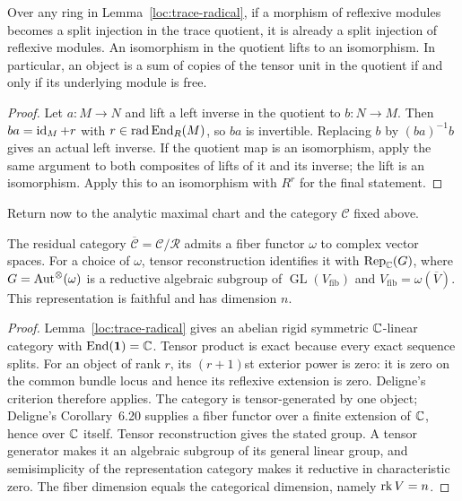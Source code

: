 \begin{lemma}
\label{loc:split-lift}
Over any ring in Lemma~\ref{loc:trace-radical},
if a morphism of reflexive modules becomes a split injection in the
trace quotient, it is already a split injection of reflexive modules.
An isomorphism in the quotient lifts to an isomorphism.  In
particular, an object is a sum of copies of the tensor unit in the
quotient if and only if its underlying module is free.
\end{lemma}

\begin{proof}
Let $a:M\to N$ and lift a left inverse in the quotient to
$b:N\to M$.  Then $ba=\operatorname{id}_M+r$ with $r\in\operatorname{rad}\operatorname{End}_R(M)$,
so $ba$ is invertible.  Replacing $b$ by $(ba)^{-1}b$ gives an
actual left inverse.  If the quotient map is an isomorphism, apply
the same argument to both composites of lifts of it and its inverse;
the lift is an isomorphism.  Apply this to an isomorphism with $R^r$
for the final statement.
\end{proof}

Return now to the analytic maximal chart and the category $\mathcal C$
fixed above.

\begin{proposition}
\label{loc:tannakian}
The residual category $\overline{\mathcal C}=\mathcal C/\mathcal R$
admits a fiber functor $\omega$ to complex vector spaces.  For a choice
of $\omega$, tensor reconstruction identifies it with
$\operatorname{Rep}_{\mathbb C}(G)$, where
$G=\operatorname{Aut}^\otimes(\omega)$ is a reductive algebraic subgroup of
$\operatorname{GL}(V_{\mathrm{fib}})$ and
$V_{\mathrm{fib}}=\omega(\overline V)$.  This representation is
faithful and has dimension $n$.
\end{proposition}

\begin{proof}
Lemma~\ref{loc:trace-radical} gives an abelian rigid symmetric
$\mathbb C$-linear category with $\operatorname{End}({\bf1})=\mathbb C$.  Tensor product is
exact because every exact sequence splits.  For an object of rank
$r$, its $(r+1)$st exterior power is zero: it is zero on the common
bundle locus and hence its reflexive extension is zero.  Deligne's
criterion \cite[Theorem 7.1]{Deligne1990} therefore applies.  The
category is tensor-generated by one object; Deligne's
Corollary~6.20 supplies a fiber functor over a finite extension of
$\mathbb C$, hence over $\mathbb C$ itself.  Tensor reconstruction gives the
stated group.  A tensor generator makes it an algebraic subgroup of
its general linear group, and semisimplicity of the representation
category makes it reductive in characteristic zero.  The fiber
dimension equals the categorical dimension, namely $\operatorname{rk} V=n$.
\end{proof}

